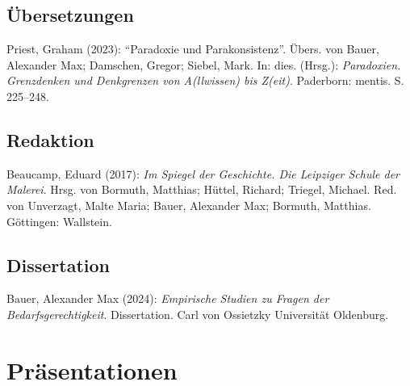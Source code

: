 \documentclass[a4paper,10pt]{article}
\newenvironment{literature}{%
   \parskip6pt\parindent0pt\raggedright
   \def\lititem{\hangindent=1cm\hangafter1}}{%
   \par\ignorespaces}
\begin{document}
\subsection*{Übersetzungen}
\begin{literature}
\lititem Priest, Graham (2023): \enquote{Paradoxie und Parakonsistenz}. Übers. von Bauer, Alexander Max; Damschen, Gregor; Siebel, Mark. In: dies. (Hrsg.): \textit{Paradoxien. Grenzdenken und Denkgrenzen von A(llwissen) bis Z(eit)}. Paderborn: mentis. S. 225--248.
\end{literature}


\subsection*{Redaktion}
\begin{literature}
\lititem Beaucamp, Eduard (2017): \textit{Im Spiegel der Geschichte. Die Leipziger Schule der Malerei}. Hrsg. von Bormuth, Matthias; Hüttel, Richard; Triegel, Michael. Red. von Unverzagt, Malte Maria; Bauer, Alexander Max; Bormuth, Matthias. Göttingen: Wallstein.
\end{literature}


\subsection*{Dissertation}
\begin{literature}
\lititem Bauer, Alexander Max (2024): \textit{Empirische Studien zu Fragen der Bedarfsgerechtigkeit}. Dissertation. Carl von Ossietzky Universität Oldenburg.
\end{literature}


\clearpage
\section{Präsentationen}


\end{document}
